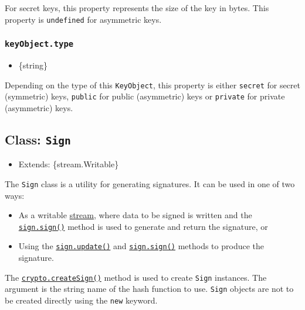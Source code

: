 For secret keys, this property represents the size of the key in bytes.
This property is \texttt{undefined} for asymmetric keys.

\subsubsection{\texorpdfstring{\texttt{keyObject.type}}{keyObject.type}}\label{keyobject.type}

\begin{itemize}
\tightlist
\item
  \{string\}
\end{itemize}

Depending on the type of this \texttt{KeyObject}, this property is
either \texttt{\textquotesingle{}secret\textquotesingle{}} for secret
(symmetric) keys, \texttt{\textquotesingle{}public\textquotesingle{}}
for public (asymmetric) keys or
\texttt{\textquotesingle{}private\textquotesingle{}} for private
(asymmetric) keys.

\subsection{\texorpdfstring{Class:
\texttt{Sign}}{Class: Sign}}\label{class-sign}

\begin{itemize}
\tightlist
\item
  Extends: \{stream.Writable\}
\end{itemize}

The \texttt{Sign} class is a utility for generating signatures. It can
be used in one of two ways:

\begin{itemize}
\tightlist
\item
  As a writable \href{stream.md}{stream}, where data to be signed is
  written and the
  \hyperref[signsignprivatekey-outputencoding]{\texttt{sign.sign()}}
  method is used to generate and return the signature, or
\item
  Using the
  \hyperref[signupdatedata-inputencoding]{\texttt{sign.update()}} and
  \hyperref[signsignprivatekey-outputencoding]{\texttt{sign.sign()}}
  methods to produce the signature.
\end{itemize}

The
\hyperref[cryptocreatesignalgorithm-options]{\texttt{crypto.createSign()}}
method is used to create \texttt{Sign} instances. The argument is the
string name of the hash function to use. \texttt{Sign} objects are not
to be created directly using the \texttt{new} keyword.

